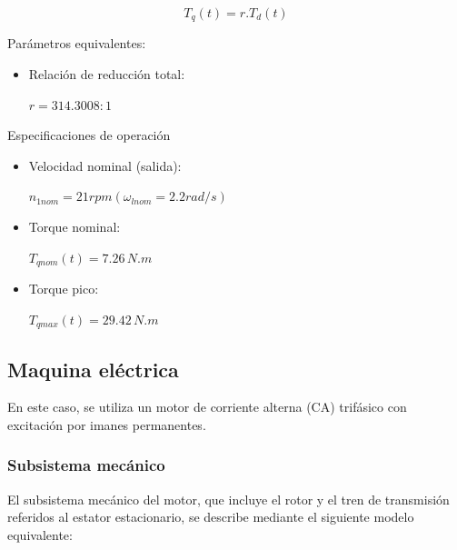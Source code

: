 \documentclass{article}
\begin{document}
    \begin{equation}\label{eq:tren_de_transmision2}
        T_{q}(t) = r.T_{d}(t)
    \end{equation}

    Parámetros equivalentes:

    \begin{itemize}
        \item Relación de reducción total: \begin{minipage}[c]{0.5\textwidth}
            \centering
            \(r = 314.3008 : 1\)
            \end{minipage}
    \end{itemize}

    Especificaciones de operación

    \begin{itemize}
        \item Velocidad nominal (salida): \quad \begin{minipage}[c]{0.5\textwidth}
            \centering
            \(n_{1nom} = 21 rpm (\omega_{lnom} = 2.2 rad/s)\)
            \end{minipage}
        \item Torque nominal: \quad\quad\quad \begin{minipage}[c]{0.5\textwidth}
            \centering
            \(T_{qnom}(t) = 7.26 \, N.m \)
            \end{minipage}
        \item Torque pico: \quad\quad\quad\quad \begin{minipage}[c]{0.5\textwidth}
            \centering
            \(T_{qmax}(t) = 29.42 \, N.m \)
            \end{minipage}
    \end{itemize}


\subsection{Maquina eléctrica}
    
    En este caso, se utiliza un motor de corriente alterna (CA) trifásico con excitación por imanes permanentes. 

    \subsubsection{Subsistema mecánico}
        
        El subsistema mecánico del motor, que incluye el rotor y el tren de transmisión referidos 
        al estator estacionario, se describe mediante el siguiente modelo equivalente:
        
\end{document}
